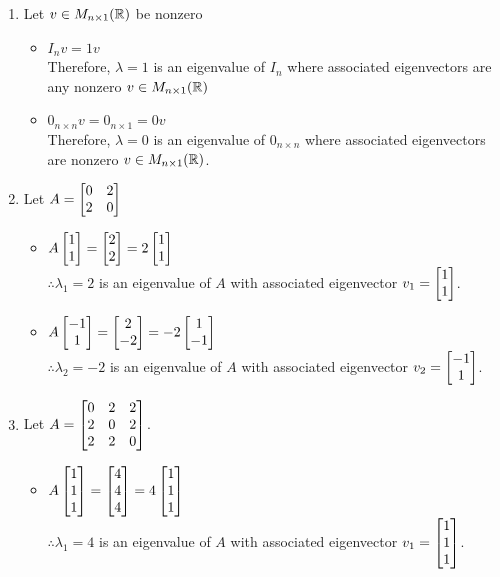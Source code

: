 \begin{example}
\leavevmode
\begin{enumerate}
    \item Let $v \in M_{n \times 1}(\mathbb{R})$ be nonzero 
    \begin{itemize}
        \item $I_nv = 1v$ \\
        Therefore, $\lambda = 1$ is an eigenvalue of $I_n$ where associated eigenvectors are any nonzero $v \in M_{n \times 1}(\mathbb{R})$
        \item $0_{n \times n}v = 0_{n \times 1} = 0v$ \\
        Therefore, $\lambda = 0$ is an eigenvalue of $0_{n \times n}$ where associated eigenvectors are nonzero $v \in M_{n \times 1}(\mathbb{R})$.
    \end{itemize}
    \item Let $A = \begin{bmatrix} 0 & 2 \\ 2 & 0 \end{bmatrix}$
    \begin{itemize}
        \item $A\begin{bmatrix} 1 \\ 1 \end{bmatrix} = \begin{bmatrix} 2 \\ 2 \end{bmatrix} = 2\begin{bmatrix} 1 \\ 1 \end{bmatrix}$ \\
        $\therefore \lambda_1 = 2$ is an eigenvalue of $A$ with associated eigenvector $v_1 =\begin{bmatrix} 1 \\ 1 \end{bmatrix}$.
        \item $A\begin{bmatrix} -1 \\ 1 \end{bmatrix} = \begin{bmatrix} 2 \\ -2 \end{bmatrix} = -2\begin{bmatrix} 1 \\ -1 \end{bmatrix}$ \\
        $\therefore \lambda_2 = -2$ is an eigenvalue of $A$ with associated eigenvector $v_2 = \begin{bmatrix} -1 \\ 1 \end{bmatrix}$.
    \end{itemize}
    \item Let $A = \begin{bmatrix} 0 & 2 & 2 \\ 2 & 0 & 2 \\ 2 & 2 & 0 \end{bmatrix}$.
    \begin{itemize}
        \item $A\begin{bmatrix} 1 \\ 1 \\ 1 \end{bmatrix} = \begin{bmatrix} 4 \\ 4 \\ 4 \end{bmatrix} = 4\begin{bmatrix} 1 \\ 1 \\ 1 \end{bmatrix}$ \\
        $\therefore \lambda_1 = 4$ is an eigenvalue of $A$ with associated eigenvector $v_1 = \begin{bmatrix} 1 \\ 1 \\ 1 \end{bmatrix}$.

\end{itemize}
\end{enumerate}
\end{example}
